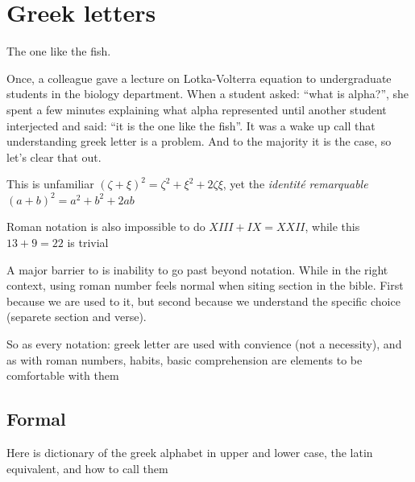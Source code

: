 \documentclass[
  letterpaper,
  DIV=11,
  numbers=noendperiod]{scrreprt}
\begin{document}
\chapter{Greek letters}\label{sec-greek}

The one like the fish.

Once, a colleague gave a lecture on Lotka-Volterra equation to
undergraduate students in the biology department. When a student asked:
``what is alpha?'', she spent a few minutes explaining what alpha
represented until another student interjected and said: ``it is the one
like the fish''. It was a wake up call that understanding greek letter
is a problem. And to the majority it is the case, so let's clear that
out.

This is unfamiliar \((\zeta  + \xi)^2 = \zeta^2 + \xi^2 + 2\zeta\xi\),
yet the \emph{identité remarquable} \((a + b) ^ 2 = a^2 + b^2 + 2ab\)

Roman notation is also impossible to do \(XIII + IX = XXII\), while this
\(13 + 9 = 22\) is trivial

A major barrier to is inability to go past beyond notation. While in the
right context, using roman number feels normal when siting section in
the bible. First because we are used to it, but second because we
understand the specific choice (separete section and verse).

So as every notation: greek letter are used with convience (not a
necessity), and as with roman numbers, habits, basic comprehension are
elements to be comfortable with them

\section*{Formal}\label{formal-1}


Here is dictionary of the greek alphabet in upper and lower case, the
latin equivalent, and how to call them
\end{document}

